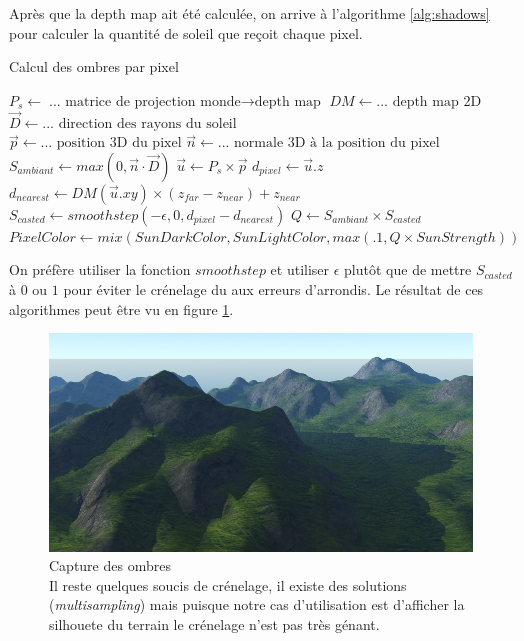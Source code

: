 \documentclass{EPUProjetDi}
\begin{document}
Après que la depth map ait été calculée, on arrive à l'algorithme \ref{alg:shadows} pour calculer la quantité de soleil que reçoit chaque pixel.
\begin{algorithm}
\caption{Calcul des ombres par pixel}
\label{alg:shadows}
\begin{algorithmic}
\State $P_s \gets \text{... matrice de projection monde$\rightarrow$depth map}$
\State $DM \gets \text{... depth map 2D}$
\State $\vec{D} \gets \text{... direction des rayons du soleil}$
\\
\State $\vec{p} \gets \text{...  position 3D du pixel}$
\State $\vec{n} \gets \text{... normale 3D à la position du pixel}$
\\
\State $S_{ambiant} \gets max(0, \vec{n}\cdot \vec{D})$
\State $\vec{u} \gets P_s\times\vec{p}$
\State $d_{pixel} \gets \vec{u}.z$
\State $d_{nearest} \gets DM(\vec{u}.xy)\times(z_{far}-z_{near})+z_{near}$
\State $S_{casted} \gets smoothstep(-\epsilon, 0, d_{pixel}-d_{nearest})$
\State $Q \gets S_{ambiant}\times S_{casted}$
\\
\State $PixelColor\gets mix(SunDarkColor, SunLightColor, max(.1, Q\times SunStrength))$
\end{algorithmic}
\end{algorithm}

On préfère utiliser la fonction $smoothstep$ et utiliser $\epsilon$ plutôt que de mettre $S_{casted}$ à $0$ ou $1$ pour éviter le crénelage du aux erreurs d'arrondis. Le résultat de ces algorithmes peut être vu en figure \ref{fig:shadows}.

\begin{figure}
	\centering
	\includegraphics[scale=.75]{shadows}
	\caption[Capture des ombres]{Capture des ombres\\Il reste quelques soucis de crénelage, il existe des solutions (\textit{multisampling}) mais puisque notre cas d'utilisation est d'afficher la silhouete du terrain le crénelage n'est pas très génant.}
	\label{fig:shadows}
\end{figure}
\end{document}
